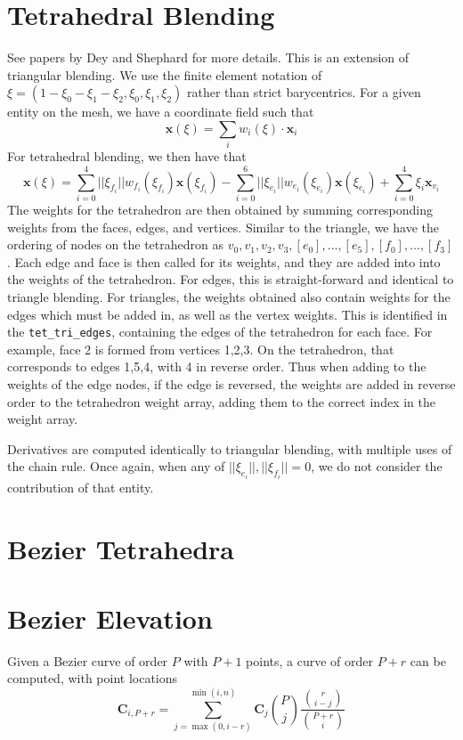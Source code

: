 \documentclass{article}
\begin{document}
\section{Tetrahedral Blending}
See papers by Dey and Shephard for more details. This is an extension of triangular blending. We use the finite element notation of $\xi = (1-\xi_0-\xi_1-\xi_2,\xi_0,\xi_1,\xi_2)$ rather than strict barycentrics. For a given entity on the mesh, we have a coordinate field such that 
\[ \mathbf{x}(\xi) = \sum_i w_i(\xi) \cdot \mathbf{x}_i \]
For tetrahedral blending, we then have that
\[\mathbf{x}(\xi) = \sum_{i=0}^{4}||\xi_{f_i}||w_{f_i}(\xi_{f_i})\mathbf{x}(\xi_{f_i}) - \sum_{i=0}^{6}||\xi_{e_i}||w_{e_i}(\xi_{e_i})\mathbf{x}(\xi_{e_i}) + \sum_{i=0}^{4}\xi_i\mathbf{x}_{v_i}\]
The weights for the tetrahedron are then obtained by summing corresponding weights from the faces, edges, and vertices. Similar to the triangle, we have the ordering of nodes on the tetrahedron as $v_0,v_1,v_2,v_3,[e_0],\ldots,[e_5],[f_0],\ldots,[f_3]$. Each edge and face is then called for its weights, and they are added into into the weights of the tetrahedron. For edges, this is straight-forward and identical to triangle blending. For triangles, the weights obtained also contain weights for the edges which must be added in, as well as the vertex weights. This is identified in the 
\texttt{tet\_tri\_edges}, containing the edges of the tetrahedron for each face. For example, face 2 is formed from vertices 1,2,3. On the tetrahedron, that corresponds to edges 1,5,4, with 4 in reverse order. Thus when adding to the weights of the edge nodes, if the edge is reversed, the weights are added in reverse order to the tetrahedron weight array, adding them to the correct index in the weight array.

Derivatives are computed identically to triangular blending, with multiple uses of the chain rule. Once again, when any of $||\xi_{e_i}||,||\xi_{f_i}|| = 0$, we do not consider the contribution of that entity.

\section{Bezier Tetrahedra}


\section{Bezier Elevation}
Given a Bezier curve of order $P$ with $P+1$ points, a curve of order $P+r$ can be computed, with point locations
\[
	\mathbf{C}_{i,P+r} = \displaystyle\sum_{j = \max(0,i-r)}^{\min(i,n)} \mathbf{C}_j {P \choose j} \frac{{r \choose i-j}}{{P+r \choose i}}
\]
\end{document}
